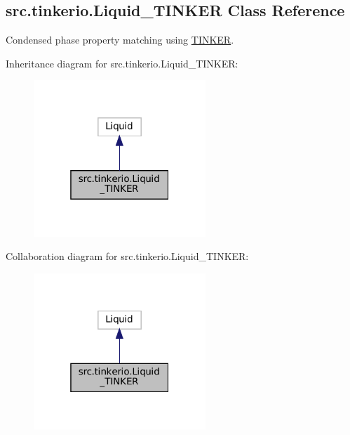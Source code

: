 \hypertarget{classsrc_1_1tinkerio_1_1Liquid__TINKER}{}\subsection{src.\+tinkerio.\+Liquid\+\_\+\+T\+I\+N\+K\+ER Class Reference}
\label{classsrc_1_1tinkerio_1_1Liquid__TINKER}


Condensed phase property matching using \hyperlink{classsrc_1_1tinkerio_1_1TINKER}{T\+I\+N\+K\+ER}.  




Inheritance diagram for src.\+tinkerio.\+Liquid\+\_\+\+T\+I\+N\+K\+ER\+:
\nopagebreak
\begin{figure}[H]
\begin{center}
\leavevmode
\includegraphics[width=184pt]{classsrc_1_1tinkerio_1_1Liquid__TINKER__inherit__graph}
\end{center}
\end{figure}


Collaboration diagram for src.\+tinkerio.\+Liquid\+\_\+\+T\+I\+N\+K\+ER\+:
\nopagebreak
\begin{figure}[H]
\begin{center}
\leavevmode
\includegraphics[width=184pt]{classsrc_1_1tinkerio_1_1Liquid__TINKER__coll__graph}
\end{center}
\end{figure}
